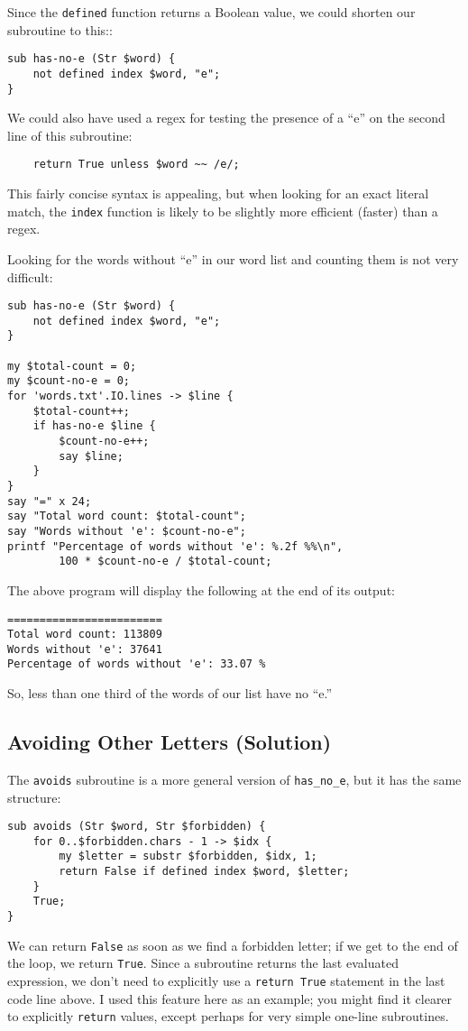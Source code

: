 Since the {\tt defined} function returns a Boolean value, we 
could shorten our subroutine to this::
\begin{verbatim}
sub has-no-e (Str $word) {
    not defined index $word, "e";
}
\end{verbatim}
%

We could also have used a regex for testing the presence of a 
``e'' on the second line of this subroutine:

\begin{verbatim}
    return True unless $word ~~ /e/;
\end{verbatim}
%

This fairly concise syntax is appealing, but when 
looking for an exact literal match, the {\tt index} function 
is likely to be slightly more efficient (faster) than a 
regex.

Looking for the words without ``e'' in our word list and 
counting them is not very difficult:

\begin{verbatim}
sub has-no-e (Str $word) {
    not defined index $word, "e";
}

my $total-count = 0;
my $count-no-e = 0;
for 'words.txt'.IO.lines -> $line { 
    $total-count++;
    if has-no-e $line {
        $count-no-e++;
        say $line;
    }
}
say "=" x 24;
say "Total word count: $total-count";
say "Words without 'e': $count-no-e";
printf "Percentage of words without 'e': %.2f %%\n", 
        100 * $count-no-e / $total-count;
\end{verbatim}

The above program will display the following at the end 
of its output:

\begin{verbatim}
========================
Total word count: 113809
Words without 'e': 37641
Percentage of words without 'e': 33.07 %
\end{verbatim}

So, less than one third of the words of 
our list have no ``e.''

\subsection{Avoiding Other Letters (Solution)}

The {\tt avoids} subroutine is a more general version of 
\verb"has_no_e", but it has the same structure:

\begin{verbatim}
sub avoids (Str $word, Str $forbidden) {
    for 0..$forbidden.chars - 1 -> $idx {
        my $letter = substr $forbidden, $idx, 1;
        return False if defined index $word, $letter;
    }
    True;
}
\end{verbatim}
%
We can return {\tt False} as soon as we find a forbidden letter;
if we get to the end of the loop, we return {\tt True}. Since 
a subroutine returns the last evaluated expression, we don't 
need to explicitly use a {\tt return True} statement in the last 
code line above. I used this feature here as an example; you might 
find it clearer to explicitly {\tt return} values, except 
perhaps for very simple one-line subroutines.

